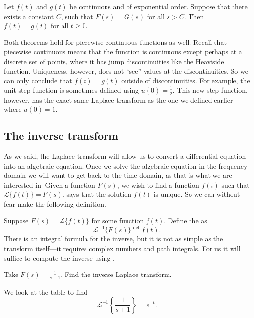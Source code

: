 \documentclass{ximera}
\begin{document}
\begin{theorem}[Uniqueness]
\label{lt:uniqthm}
Let $f(t)$ and $g(t)$ be continuous and of exponential order. Suppose that there exists a constant $C$, such that $F(s) = G(s)$ for all $s > C$. Then $f(t) = g(t)$ for all $t \geq 0$.
\end{theorem}

Both theorems hold for piecewise continuous functions as well. Recall that piecewise continuous means that the function is continuous except perhaps at a discrete set of points, where it has jump discontinuities like the Heaviside function.  Uniqueness, however, does not ``see'' values at the discontinuities.  So we can only conclude that $f(t) = g(t)$ outside of discontinuities.  For example, the unit step function is sometimes defined using $u(0) = \frac{1}{2}$.  This new step function, however, has the exact same Laplace transform as the one we defined earlier where $u(0) = 1$.

\subsection{The inverse transform}

As we said, the Laplace transform will allow us to convert a differential equation into an algebraic equation.  Once we solve the algebraic equation in the frequency domain we will want to get back to the time domain, as that is what we are interested in. Given a function $F(s)$, we wish to find a function $f(t)$ such that $\mathcal{L} \bigl\{ f(t) \bigr\} = F(s)$.  says that the solution $f(t)$ is unique. So we can without fear make the following definition.

Suppose $F(s) = \mathcal{L} \bigl\{ f(t) \bigr\}$ for some function $f(t)$. Define the \emph{} as
\begin{equation*}
    {\mathcal{L}}^{-1} \bigl\{ F(s) \bigr\} \overset{\text{def}}{=} f(t) .
\end{equation*}
There is an integral formula for the inverse, but it is not as simple as the transform itself---it requires complex numbers and path integrals. For us it will suffice to compute the inverse using .

\begin{example}
    Take $F(s) = \frac{1}{s+1}$.  Find the inverse Laplace transform.
    
    We look at the table to find
    \begin{equation*}
        {\mathcal{L}}^{-1} \left\{ \frac{1}{s+1} \right\} = e^{-t} .
    \end{equation*}
\end{example}
\end{document}
